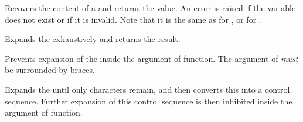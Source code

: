 \documentclass[oneside]{book}
\let\tn=\cs
\begin{document}
\begin{function}{\Value}
\begin{syntax}
 
\end{syntax}
Recovers the content of a  and returns the value.
An error is raised if the variable does not exist or if it is invalid.
Note that it is the same as  for , or  for .
\end{function}

\begin{function}{\Expand}
\begin{syntax}
 
\end{syntax}
Expands the  exhaustively and returns the result.
\end{function}

\begin{function}{\UnExpand}
\begin{syntax}
 
\end{syntax}
Prevents expansion of the  inside the argument of  function.
The argument of  \emph{must} be surrounded by braces.
\end{function}

\begin{function}{\OnlyName}
\begin{syntax}
 
\end{syntax}
Expands the  until only characters remain, and then
converts this into a control sequence.
Further expansion of this control sequence is then inhibited
inside the argument of  function.
\end{function}
\end{document}
